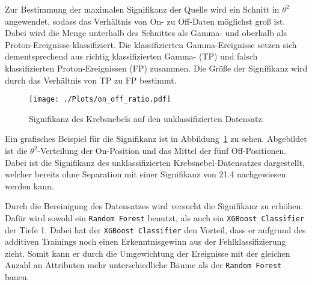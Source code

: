 Zur Bestimmung der maximalen Signifikanz der Quelle wird ein Schnitt in $\theta^{2}$ angewendet, sodass das Verhältnis von On- zu Off-Daten möglichst groß ist.
Dabei wird die Menge unterhalb des Schnittes als Gamma- und oberhalb als Proton-Ereignisse klassifiziert.
Die klassifizierten Gamma-Ereignisse setzen sich dementsprechend aus richtig klassifizierten Gamma- (TP) und falsch klassifizierten Proton-Ereignissen (FP) zusammen. 
Die Größe der Signifikanz wird durch das Verhältnis von TP zu FP bestimmt.
\begin{figure}[H]
  \centering
  \texttt{[image: ./Plots/on\_off\_ratio.pdf]}
  \caption{Signifikanz des Krebsnebels auf den unklassifizierten Datensatz.}
  \label{fig:sig_crab}
\end{figure}
Ein grafisches Beispiel für die Signifikanz ist in Abbildung~\ref{fig:sig_crab} zu sehen. 
Abgebildet ist die $\theta^{2}$-Verteilung der On-Position und das Mittel der fünf Off-Positionen.
Dabei ist die Signifikanz des unklassifizierten Krebsnebel-Datensatzes dargestellt, welcher bereits ohne Separation mit einer Signifikanz von \SI{21,4}{\sigma} nachgewiesen werden kann.

Durch die Bereinigung des Datensatzes wird versucht die Signifikanz zu erhöhen.
Dafür wird sowohl ein \texttt{Random Forest} benutzt, als auch ein \texttt{XGBoost Classifier} der Tiefe 1. 
Dabei hat der \texttt{XGBoost Classifier} den Vorteil, dass er aufgrund des additiven Trainings noch einen Erkenntnisgewinn aus der Fehlklassifizierung zieht.
Somit kann er durch die Umgewichtung der Ereignisse mit der gleichen Anzahl an Attributen mehr unterschiedliche Bäume als der \texttt{Random Forest} bauen.

